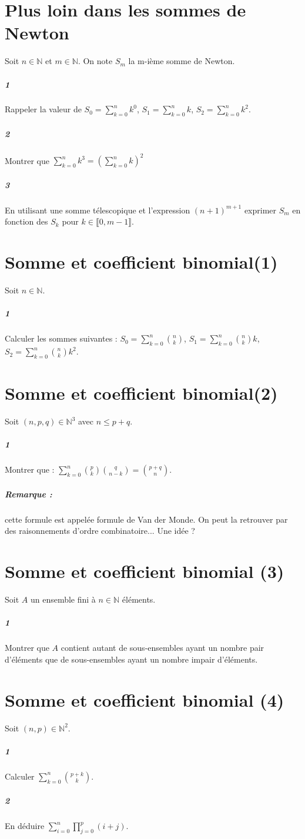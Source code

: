 \documentclass[10pt,a4paper]{article}
\begin{document}
\section{Plus loin dans les sommes de Newton}
Soit $n \in \mathbb{N}$ et $m \in \mathbb{N}$. On note $S_m$ la m-ième somme de Newton.
\subparagraph{1}Rappeler la valeur de $S_0=\sum_{k=0}^n k^0$, $S_1=\sum_{k=0}^n k$, $S_2=\sum_{k=0}^n k^2$.
\subparagraph{2}Montrer que $\sum_{k=0}^n k^3=\left( \sum_{k=0}^n  k\right)^2$
\subparagraph{3}En utilisant une somme télescopique et l'expression $(n+1)^{m+1}$ exprimer $S_m$ en fonction des $S_k$ pour $k \in \llbracket 0,m-1 \rrbracket$.

\section{Somme et coefficient binomial(1)}
Soit $n \in \mathbb{N}$.
\subparagraph{1}Calculer les sommes suivantes : $S_0=\sum_{k=0}^n {n \choose k}$, $S_1=\sum_{k=0}^n {n \choose k}k$, $S_2=\sum_{k=0}^n {n \choose k}k^2$.

\section{Somme et coefficient binomial(2)}
Soit $(n,p,q) \in \mathbb{N}^3$ avec $n\le p+q$. 
\subparagraph{1} Montrer que : $\sum_{k=0}^n {p \choose k}{q \choose n-k}={p+q \choose n}$.
\subparagraph{Remarque :} cette formule est appelée formule de Van der Monde. On peut la retrouver par des raisonnements d'ordre combinatoire... Une idée ? 

\section{Somme et coefficient binomial (3)}
Soit $A$ un ensemble fini à $n \in \mathbb{N}$ éléments.
\subparagraph{1}Montrer que $A$ contient autant de sous-ensembles ayant un nombre pair d'éléments que de sous-ensembles ayant un nombre impair d'éléments.

\section{Somme et coefficient binomial (4)}
Soit $(n,p) \in \mathbb{N}^2$.
\subparagraph{1}Calculer $\sum_{k=0}^n {p+k \choose k}$.
\subparagraph{2}En déduire $\sum_{i=0}^n \prod_{j=0}^p(i+j)$.
\end{document}
